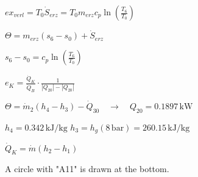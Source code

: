 \( ex_{verl} = T_0 \dot{S}_{erz} = T_0 m_{erz} c_p \ln \left( \frac{T_6}{T_0} \right) \)  

\( \Theta = m_{erz} (s_6 - s_0) + \dot{S}_{erz} \)  

\( s_6 - s_0 = c_p \ln \left( \frac{T_6}{T_0} \right) \)

\( e_K = \frac{\dot{Q}_K}{\dot{Q}_B} \cdot \frac{1}{|Q_{20}| - |Q_{20}|} \)  

\( \Theta = \dot{m}_2 (h_4 - h_3) - \dot{Q}_{30} \quad \rightarrow \quad Q_{20} = 0.1897 \, \text{kW} \)  

\( h_4 = 0.342 \, \text{kJ/kg} \)  
\( h_3 = h_g (8 \, \text{bar}) = 260.15 \, \text{kJ/kg} \)  

\( \dot{Q}_K = \dot{m} (h_2 - h_1) \)  

A circle with "A11" is drawn at the bottom.